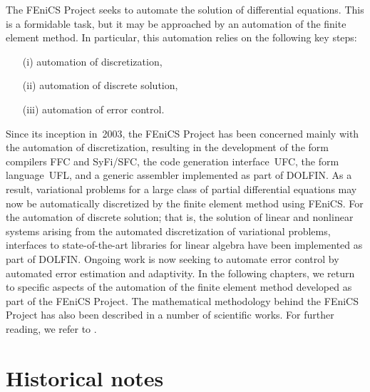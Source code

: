 The FEniCS Project seeks to automate the solution of differential
equations. This is a formidable task, but it may be approached by an
automation of the finite element method. In particular, this
automation relies on the following key steps:
\begin{itemize}
\item[(i)]
  automation of discretization,
\item[(ii)]
  automation of discrete solution,
\item[(iii)]
  automation of error control.
\end{itemize}
Since its inception in~2003, the FEniCS Project has been concerned
mainly with the automation of discretization, resulting in the
development of the form compilers FFC and SyFi/SFC, the code
generation interface~UFC, the form language~UFL, and a generic
assembler implemented as part of DOLFIN. As a result, variational
problems for a large class of partial differential equations may now
be automatically discretized by the finite element method using
FEniCS. For the automation of discrete solution; that is, the solution
of linear and nonlinear systems arising from the automated
discretization of variational problems, interfaces to state-of-the-art
libraries for linear algebra have been implemented as part of
DOLFIN. Ongoing work is now seeking to automate error control by
automated error estimation and adaptivity. In the following chapters,
we return to specific aspects of the automation of the finite element
method developed as part of the FEniCS Project. The mathematical
methodology behind the FEniCS Project has also been described in
a number of scientific works. For further reading, we refer to
\citet{Logg2007a,LoggWells2010,Kirby2004,KirbyLogg2006,
AlnaesLoggMardalEtAl2009,AlnaesMardal2009b,KirbyKnepleyLoggEtAl2005,
KirbyLoggScottEtAl2006,KirbyLogg2007,KirbyLogg2008,KirbyScott2007,
Kirby2006a,OelgaardLoggWells2008,RognesKirbyLogg2009,OelgaardWells2010,
Logg2009}.

\section{Historical notes}

